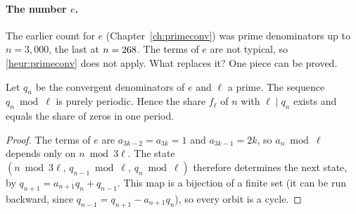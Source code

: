 \paragraph{The number $e$.} The earlier count for $e$ (Chapter~\ref{ch:primeconv}) was \OqEobs{} prime denominators up to $n = 3{,}000$, the last at $n = 268$. The terms of $e$ are not typical, so \cref{heur:primeconv} does not apply. What replaces it? One piece can be proved.

\begin{proposition}\label{prop:oq-e}
Let $q_n$ be the convergent denominators of $e$ and $\ell$ a prime. The sequence $q_n \bmod \ell$ is purely periodic. Hence the share $f_\ell$ of $n$ with $\ell \mid q_n$ exists and equals the share of zeros in one period.
\end{proposition}

\begin{proof}
The terms of $e$ are $a_{3k-2} = a_{3k} = 1$ and $a_{3k-1} = 2k$, so $a_n \bmod \ell$ depends only on $n \bmod 3\ell$. The state $(n \bmod 3\ell,\, q_{n-1} \bmod \ell,\, q_n \bmod \ell)$ therefore determines the next state, by $q_{n+1} = a_{n+1}q_n + q_{n-1}$. This map is a bijection of a finite set (it can be run backward, since $q_{n-1} = q_{n+1} - a_{n+1} q_n$), so every orbit is a cycle.
\end{proof}

